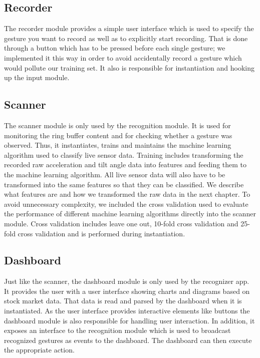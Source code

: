 \subsection{Recorder}
\label{ch:SystemDesign:sec:Components:sub:Recorder}

The recorder module provides a simple user interface which is used to specify the gesture you want to record as well as to explicitly start recording. That is done through a button which has to be pressed before each single gesture; we implemented it this way in order to avoid accidentally record a gesture which would pollute our training set. It also is responsible for instantiation and hooking up the input module.

\subsection{Scanner}
\label{ch:SystemDesign:sec:Components:sub:Scanner}

The scanner module is only used by the recognition module. It is used for monitoring the ring buffer content and for checking whether a gesture was observed. Thus, it instantiates, trains and maintains the machine learning algorithm used to classify live sensor data. Training includes transforming the recorded raw acceleration and tilt angle data into features and feeding them to the machine learning algorithm. All live sensor data will  also have to be transformed into the same features so that they can be classified. We describe what features are and how we transformed the raw data in the next chapter.
To avoid unnecessary complexity, we included the cross validation used to evaluate the performance of different machine learning algorithms directly into the scanner module. Cross validation includes leave one out, 10-fold cross validation and 25-fold cross validation and is performed during instantiation.

\subsection{Dashboard}
\label{ch:SystemDesign:sec:Components:sub:Dashboard}

Just like the scanner, the dashboard module is only used by the recognizer app. It provides the user with a user interface showing charts and diagrams based on stock market data. That data is read and parsed by the dashboard when it is instantiated. As the user interface provides interactive elements like buttons the dashboard module is also responsible for handling user interaction. In addition, it exposes an interface to the recognition module which is used to broadcast recognized gestures as events to the dashboard. The dashboard can then execute the appropriate action.

